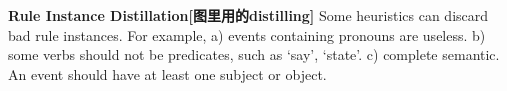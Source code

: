 
\textbf{Rule Instance Distillation[图里用的distilling]} Some heuristics can discard bad rule instances. For example, a) events containing pronouns are useless. b) some verbs should not be predicates, such as `say', `state'. c) complete semantic. An event should have at least one subject or object. 

